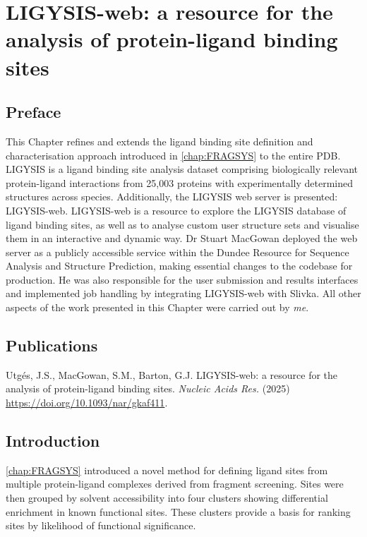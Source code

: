 \chapter{LIGYSIS-web: a resource for the analysis of protein-ligand binding sites}
\label{chap:LIGYSIS_WEB}

\section*{Preface}

This Chapter refines and extends the ligand binding site definition and characterisation approach introduced in \autoref{chap:FRAGSYS} to the entire PDB. LIGYSIS is a ligand binding site analysis dataset comprising biologically relevant protein-ligand interactions from 25,003 proteins with experimentally determined structures across species. Additionally, the LIGYSIS web server is presented: LIGYSIS-web. LIGYSIS-web is a resource to explore the LIGYSIS database of ligand binding sites, as well as to analyse custom user structure sets and visualise them in an interactive and dynamic way. Dr Stuart MacGowan deployed the web server as a publicly accessible service within the Dundee Resource for Sequence Analysis and Structure Prediction, making essential changes to the codebase for production. He was also responsible for the user submission and results interfaces and implemented job handling by integrating LIGYSIS-web with Slivka. All other aspects of the work presented in this Chapter were carried out by \textit{me}.

\section*{Publications}

Utgés, J.S., MacGowan, S.M., Barton, G.J. LIGYSIS-web: a resource for the analysis of protein-ligand binding sites. \textit{Nucleic Acids Res.} (2025) \url{https://doi.org/10.1093/nar/gkaf411}.

\section{Introduction}

\autoref{chap:FRAGSYS} introduced a novel method for defining ligand sites from multiple protein-ligand complexes derived from fragment screening. Sites were then grouped by solvent accessibility into four clusters showing differential enrichment in known functional sites. These clusters provide a basis for ranking sites by likelihood of functional significance.

